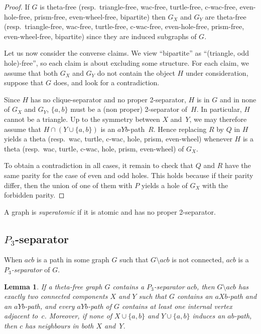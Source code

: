 \documentclass[11pt]{article}
\newtheorem{lemma}[theo]{Lemma}
\newcommand{\sm}{\setminus}
\begin{document}
\begin{proof}
  If $G$ is theta-free (resp.\ triangle-free, wac-free, turtle-free, c-wac-free, even-hole-free, prism-free, even-wheel-free, bipartite) then $G_X$ and $G_Y$ are theta-free (resp.\ triangle-free, wac-free, turtle-free, c-wac-free, even-hole-free, prism-free, even-wheel-free, bipartite) since they are induced subgraphs of $G$.

  Let us now consider the converse claims.  We view ``bipartite'' as ``(triangle, odd hole)-free'', so each claim is about excluding some structure. For each claim, we assume that both $G_X$ and $G_Y$ do not contain the object $H$ under consideration, suppose that $G$ does, and look for a contradiction. 

  Since $H$ has no clique-separator and no proper 2-separator, $H$ is in $G$ and in none of $G_X$ and $G_Y$, $\{a, b\}$ must be a (non proper) 2-separator of~$H$. 
  In particular, $H$ cannot be a triangle. Up to the symmetry between $X$ and~$Y$, we may therefore assume that $H\cap (Y\cup \{a, b\})$ is an $aYb$-path~$R$.  Hence replacing  $R$ by $Q$ in $H$ yields a theta (resp.\ wac, turtle, c-wac, hole, prism, even-wheel) whenever $H$ is a theta (resp.\ wac, turtle, c-wac, hole, prism, even-wheel) of $G_X$.
  
  To obtain a contradiction in all cases, it remain to check that $Q$ and $R$ have the same parity for the case of even and odd holes.  This holds because if their parity differ, then the union of one of them with $P$ yields a hole of $G_X$ with the forbidden parity. 
\end{proof}

A graph is \emph{superatomic} if it is atomic and has no proper 2-separator. 


\subsection*{$P_3$-separator}

When $acb$ is a path in some graph $G$ such that $G\sm acb$ is not connected, $acb$ is a \emph{$P_3$-separator} of $G$.

\begin{lemma}
  \label{l:eligibleP3}
   If a  theta-free graph $G$ contains a $P_3$-separator $acb$, then $G\sm acb$ has exactly two connected components $X$ and $Y$ such that $G$ contains an $aXb$-path and an $aYb$-path, and every $aYb$-path of $G$ contains at least one internal vertex adjacent to~$c$. Moreover, if none of $X\cup \{a, b\}$ and $Y\cup \{a, b\}$ induces an $ab$-path, then  $c$ has neighbours in both $X$ and~$Y$.
\end{lemma}
\end{document}
